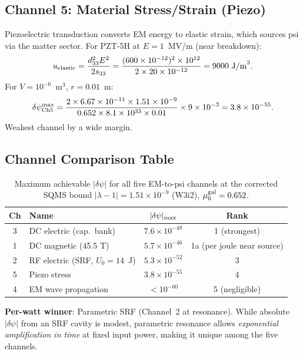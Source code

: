 \documentclass[11pt,twocolumn]{article}
\newcommand{\dpsi}{\delta\psi}
\newcommand{\lam}{\lambda}
\begin{document}
\subsection{Channel 5: Material Stress/Strain (Piezo)}

Piezoelectric transduction converts EM energy to elastic strain, which
sources psi via the matter sector. For PZT-5H at $E = 1$~MV/m (near
breakdown):
\begin{equation}
u_{\rm elastic} = \frac{d_{33}^2 E^2}{2s_{33}}
= \frac{(600\times10^{-12})^2\times10^{12}}{2\times20\times10^{-12}}
= 9000~\text{J/m}^3.
\end{equation}
For $V = 10^{-6}$~m$^3$, $r = 0.01$~m:
\begin{equation}
\dpsi_{\rm Ch5}^{\rm max} =
\frac{2\times6.67\times10^{-11}\times1.51\times10^{-9}}
{0.652\times8.1\times10^{33}\times0.01}\times9\times10^{-3}
= 3.8\times10^{-55}.
\end{equation}
Weakest channel by a wide margin.

\subsection{Channel Comparison Table}

\begin{table}[h!]
\caption{Maximum achievable $|\dpsi|$ for all five EM-to-psi channels
at the corrected SQMS bound $|\lam-1| = 1.51\times10^{-9}$ (W3i2),
$\mu_0^{\rm gal} = 0.652$.}
\label{tab:channel_comparison}
\begin{tabular}{clcc}
\toprule
Ch & Name & $|\dpsi|_{\rm max}$ & Rank \\
\midrule
3 & DC electric (cap.\ bank) & $7.6\times10^{-48}$ & 1 (strongest) \\
1 & DC magnetic (45.5 T) & $5.7\times10^{-46}$ & 1a (per joule near source) \\
2 & RF electric (SRF, $U_0=14$~J) & $5.3\times10^{-52}$ & 3 \\
5 & Piezo stress & $3.8\times10^{-55}$ & 4 \\
4 & EM wave propagation & $< 10^{-60}$ & 5 (negligible) \\
\bottomrule
\end{tabular}
\end{table}

\textbf{Per-watt winner}: Parametric SRF (Channel~2 at resonance).
While absolute $|\dpsi|$ from an SRF cavity is modest, parametric
resonance allows \emph{exponential amplification in time} at fixed input
power, making it unique among the five channels.
\end{document}
